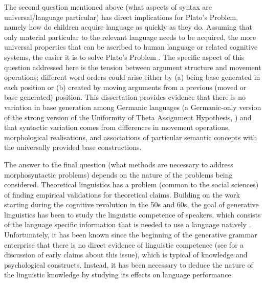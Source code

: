 The second question mentioned above (what aspects of syntax are universal/language particular) has direct implications for Plato's Problem, namely how do children acquire language as quickly as they do. Assuming that only material particular to the relevant language needs to be acquired, the more universal properties that can be ascribed to human language or related cognitive systems, the easier it is to solve Plato's Problem \citep{Chomsky.1993}. The specific aspect of this question addressed here is the tension between argument structure and movement operations; different word orders could arise either by (a) being base generated in each position or (b) created by moving arguments from a previous (moved or base generated) position. This dissertation provides evidence that there is no variation in base generation among Germanic languages (a Germanic-only version of the strong version of the Uniformity of Theta Assignment Hypothesis, \citealt{Baker.1988}) and that syntactic variation comes from differences in movement operations, morphological realisations, and associations of particular semantic concepts with the universally provided base constructions.

The answer to the final question (what methods are necessary to address morphosyntactic problems) depends on the nature of the problems being considered. Theoretical linguistics has a problem (common to the social sciences) of finding empirical validations for theoretical claims. Building on the work starting during the cognitive revolution in the 50s and 60s, the goal of generative linguistics has been to study the linguistic competence of speakers, which consists of the language specific information that is needed to use a language natively \citep{Chomsky.1981,Chomsky.1986}. Unfortunately, it has been known since the beginning of the generative grammar enterprise that there is no direct evidence of linguistic competence (see \cite{Schutze.1996} for a discussion of early claims about this issue), which is typical of knowledge and psychological constructs. Instead, it has been necessary to deduce the nature of the linguistic knowledge by studying its effects on language performance.

